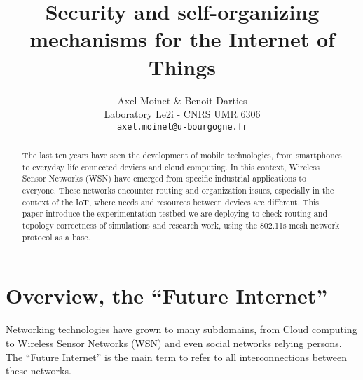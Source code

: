 \documentclass[10pt,twocolumn,letterpaper]{article}
\begin{document}
\title{Security and self-organizing mechanisms for the Internet of Things}

\author{Axel Moinet \& Benoit Darties \\
Laboratory Le2i - CNRS UMR 6306 \\
{\tt\small axel.moinet@u-bourgogne.fr}
}

\maketitle

\enlargethispage{1cm}

\begin{abstract}
  The last ten years have seen the development of mobile technologies, from smartphones to everyday life connected devices and cloud computing. In this context, Wireless Sensor Networks (WSN) have emerged from specific industrial applications to everyone. These networks encounter routing and organization issues, especially in the context of the IoT, where needs and resources between devices are different. This paper introduce the experimentation testbed we are deploying to check routing and topology correctness of simulations and research work, using the 802.11s mesh network protocol as a base.
\end{abstract}


\vspace{-0.5cm}
\section{Overview, the ``Future Internet''}


Networking technologies have grown to many subdomains, from Cloud computing to Wireless Sensor Networks (WSN) and even social networks relying persons. The ``Future Internet'' is the main term to refer to all interconnections between these networks.
\end{document}
